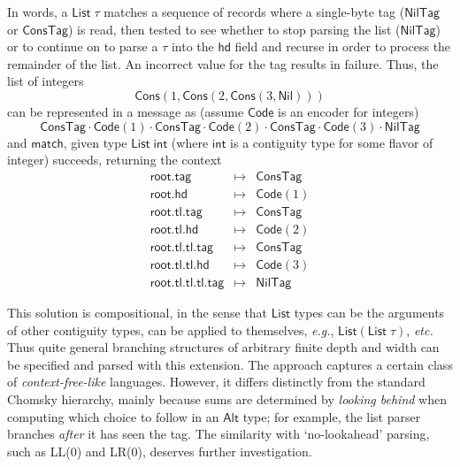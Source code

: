 \documentclass[a4paper,UKenglish,cleveref, autoref, thm-restate]{lipics-v2021}
\newcommand{\eg}{\textit{e.g.}}
\newcommand{\etc}{\textit{etc.}}
\newcommand{\konst}[1]{\ensuremath{\mathsf{#1}}}
\begin{document}
In words, a $\konst{List}\;\tau$ matches a sequence of records where
a single-byte tag (\konst{NilTag} or \konst{ConsTag}) is read, then tested to see
whether to stop parsing the list (\konst{NilTag}) or to continue on to
parse a $\tau$ into the \konst{hd} field and recurse in order to
process the remainder of the list. An incorrect value for the tag results in failure.
Thus, the list of integers
%
\[ \konst{Cons}(1, \konst{Cons}(2, \konst{Cons}(3, \konst{Nil}))) \]
%
can be represented in a message as (assume \konst{Code} is an encoder for integers)
%
\[ \konst{ConsTag}\cdot \konst{Code}(1) \cdot
   \konst{ConsTag}\cdot \konst{Code}(2) \cdot
   \konst{ConsTag}\cdot \konst{Code}(3) \cdot \konst{NilTag}
\]
%
and \konst{match}, given type $\konst{List}\; \konst{int}$
(where $\konst{int}$ is a contiguity type for some flavor of integer)
succeeds, returning the context
%
\[
\begin{array}{rcl}
\konst{root.tag} & \mapsto & \konst{ConsTag} \\
\konst{root.hd} & \mapsto & \konst{Code}(1) \\
\konst{root.tl.tag} & \mapsto & \konst{ConsTag} \\
\konst{root.tl.hd} & \mapsto & \konst{Code}(2) \\
\konst{root.tl.tl.tag} & \mapsto & \konst{ConsTag} \\
\konst{root.tl.tl.hd} & \mapsto & \konst{Code}(3) \\
\konst{root.tl.tl.tl.tag} & \mapsto & \konst{NilTag}
\end{array}
\]

This solution is compositional, in the sense that \konst{List} types
can be the arguments of other contiguity types, can be applied to
themselves, \eg, $\konst{List}(\konst{List}\;\tau)$, \etc \; Thus
quite general branching structures of arbitrary finite depth and width can
be specified and parsed with this extension.  The approach captures a
certain class of \emph{context-free-like} languages. However, it
differs distinctly from the standard Chomsky hierarchy, mainly because
sums are determined by \emph{looking behind} when computing which
choice to follow in an \konst{Alt} type; for example, the list parser
branches \emph{after} it has seen the tag. The similarity with
`no-lookahead' parsing, such as LL(0) and LR(0), deserves further
investigation.
\end{document}
